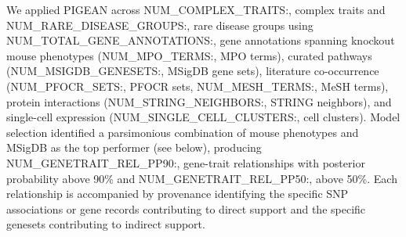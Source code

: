 We applied PIGEAN across {{NUM_COMPLEX_TRAITS:,}} complex traits and {{NUM_RARE_DISEASE_GROUPS:,}} rare disease groups using {{NUM_TOTAL_GENE_ANNOTATIONS:,}} gene annotations spanning knockout mouse phenotypes ({{NUM_MPO_TERMS:,}} MPO terms), curated pathways ({{NUM_MSIGDB_GENESETS:,}} MSigDB gene sets), literature co-occurrence ({{NUM_PFOCR_SETS:,}} PFOCR sets, {{NUM_MESH_TERMS:,}} MeSH terms), protein interactions ({{NUM_STRING_NEIGHBORS:,}} STRING neighbors), and single-cell expression ({{NUM_SINGLE_CELL_CLUSTERS:,}} cell clusters). Model selection identified a parsimonious combination of mouse phenotypes and MSigDB as the top performer (see below), producing {{NUM_GENETRAIT_REL_PP90:,}} gene-trait relationships with posterior probability above 90\% and {{NUM_GENETRAIT_REL_PP50:,}} above 50\%. Each relationship is accompanied by provenance identifying the specific SNP associations or gene records contributing to direct support and the specific genesets contributing to indirect support.
